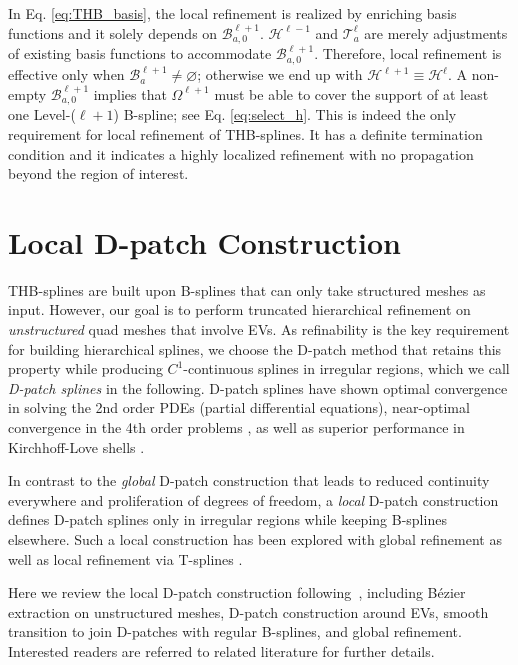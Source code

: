 \documentclass[graybox]{svmult}
\begin{document}
In Eq. \eqref{eq:THB_basis}, the local refinement is realized by enriching basis functions and it solely depends on $\mathcal{B}_{a,0}^{\ell+1}$. $\mathcal{H}^{\ell-1}$ and $\mathcal{T}_a^\ell$ are merely adjustments of existing basis functions to accommodate $\mathcal{B}_{a,0}^{\ell+1}$. Therefore, local refinement is effective only when $\mathcal{B}_a^{\ell+1} \neq \varnothing$; otherwise we end up with $\mathcal{H}^{\ell+1} \equiv \mathcal{H}^{\ell}$. A non-empty $\mathcal{B}_{a,0}^{\ell+1}$ implies that $\Omega^{\ell+1}$ must be able to cover the support of at least one Level-($\ell+1$) B-spline; see Eq. \eqref{eq:select_h}. This is indeed the only requirement for local refinement of THB-splines. It has a definite termination condition and it indicates a highly localized refinement with no propagation beyond the region of interest. 

\section{Local D-patch Construction}
\label{sec:local_Dpatch}

THB-splines are built upon B-splines that can only take structured meshes as input. However, our goal is to perform truncated hierarchical refinement on \emph{unstructured} quad meshes that involve EVs. As refinability is the key requirement for building hierarchical splines, we choose the D-patch method that retains this property while producing $C^1$-continuous splines in irregular regions, which we call \emph{D-patch splines} in the following. D-patch splines have shown optimal convergence in solving the 2nd order PDEs (partial differential equations), near-optimal convergence in the 4th order problems \cite{ref:toshniwal17}, as well as superior performance in Kirchhoff-Love shells \cite{ref:casquero20}.

In contrast to the \emph{global} D-patch construction \cite{ref:reif97, ref:tnguyen16} that leads to reduced continuity everywhere and proliferation of degrees of freedom, a \emph{local} D-patch construction defines D-patch splines only in irregular regions while keeping B-splines elsewhere. Such a local construction has been explored with global refinement \cite{ref:toshniwal17} as well as local refinement via T-splines \cite{ref:casquero20}.

Here we review the local D-patch construction following~\cite{ref:casquero20}, including B\'{e}zier extraction on unstructured meshes, D-patch construction around EVs, smooth transition to join D-patches with regular B-splines, and global refinement. Interested readers are referred to related literature \cite{ref:reif97, ref:toshniwal17, ref:casquero20} for further details.
\end{document}
